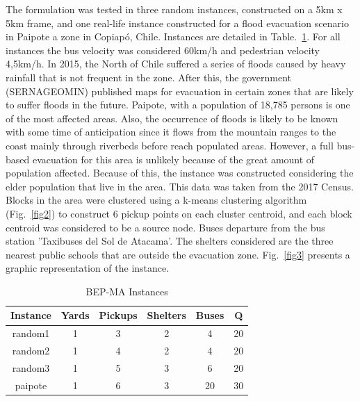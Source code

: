 \documentclass[conference]{IEEEtran}
\begin{document}
The formulation was tested in three random instances, constructed on a 5km x 5km frame, and one real-life instance constructed for a flood evacuation scenario in Paipote a zone in Copiap\'o, Chile. Instances are detailed in Table.~\ref{table:inst}. For all instances the bus velocity was considered 60km/h and pedestrian velocity 4,5km/h.
In 2015, the North of Chile suffered a series of floods caused by heavy rainfall that is not frequent in the zone. After this, the government (SERNAGEOMIN) published maps for evacuation in certain zones that are likely to suffer floods in the future. Paipote, with a population of 18,785 persons is one of the most affected areas. Also, the occurrence of floods is likely to be known with some time of anticipation since it flows from the mountain ranges to the coast mainly through riverbeds before reach populated areas. However, a full bus-based evacuation for this area is unlikely because of the great amount of population affected. Because of this, the instance was constructed considering the elder population that live in the area. This data was taken from the 2017 Census. Blocks in the area were clustered using a k-means clustering algorithm (Fig.~\ref{fig2}) to construct 6 pickup points on each cluster centroid, and each block centroid was considered to be a source node. Buses departure from the bus station 'Taxibuses del Sol de Atacama'. The shelters considered are the three nearest public schools that are outside the evacuation zone.  Fig.~\ref{fig3} presents a graphic representation of the instance.
\begin{table}[htbp]

\caption{BEP-MA Instances}
\begin{center}
\begin{tabular}{ cccccc } 
\hline
Instance & Yards & Pickups & Shelters & Buses & Q\\ 
\hline
random1 & 1 & 3 & 2 & 4 & 20\\
random2 & 1 & 4 & 2 & 4  & 20\\
random3 & 1 & 5 & 3 & 6  & 20\\
paipote & 1 & 6 & 3 & 20  & 30\\

\hline
\end{tabular}
\end{center}
\label{table:inst}
\end{table}
\end{document}
